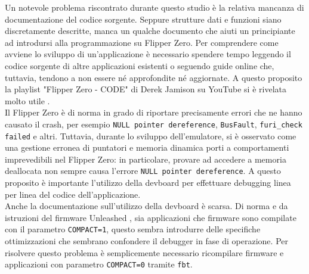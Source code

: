 Un notevole problema riscontrato durante questo studio è la relativa mancanza di documentazione del codice sorgente. Seppure strutture dati e funzioni siano discretamente descritte, manca un qualche documento che aiuti un principiante ad introdursi alla programmazione su Flipper Zero. Per comprendere come avviene lo sviluppo di un'applicazione è necessario spendere tempo leggendo il codice sorgente di altre applicazioni esistenti o seguendo guide online che, tuttavia, tendono a non essere né approfondite né aggiornate. A questo proposito la playlist "Flipper Zero - CODE" di Derek Jamison su YouTube si è rivelata molto utile \cite{derek}.\\
Il Flipper Zero è di norma in grado di riportare precisamente errori che ne hanno causato il crash, per esempio \texttt{NULL pointer dereference}, \texttt{BusFault}, \texttt{furi\_check failed} e altri. Tuttavia, durante lo sviluppo dell'emulatore, si è osservato come una gestione erronea di puntatori e memoria dinamica porti a comportamenti imprevedibili nel Flipper Zero: in particolare, provare ad accedere a memoria deallocata non sempre causa l'errore \texttt{NULL pointer dereference}. A questo proposito è importante l'utilizzo della devboard per effettuare debugging linea per linea del codice dell'applicazione.\\
Anche la documentazione sull'utilizzo della devboard è scarsa.
Di norma e da istruzioni del firmware Unleashed \cite{firmware}, sia applicazioni che firmware sono compilate con il parametro \texttt{COMPACT=1}, questo sembra introdurre delle specifiche ottimizzazioni che sembrano confondere il debugger in fase di operazione. Per risolvere questo problema è semplicemente necessario ricompilare firmware e applicazioni con parametro \texttt{COMPACT=0} tramite \texttt{fbt}.
